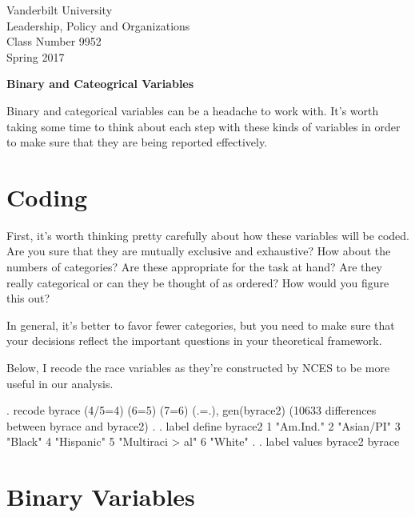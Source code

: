 \documentclass[12 pt]{article}
\begin{document}
\thispagestyle{empty}%


\setlength{\parskip}{1ex plus 0.5ex minus 0.2ex}

\setcounter{secnumdepth}{-2}



\begin{flushleft}
Vanderbilt University\\Leadership, Policy and Organizations\\Class Number 9952\\ Spring 2017
\end{flushleft}

\begin{center}
\textbf{Binary and Cateogrical Variables}
\end{center}


Binary and categorical variables can be a headache to work with. It's worth taking some time to think about each step 
with these kinds of variables in order to make sure that they are being reported effectively. 

\section{Coding}

First, it's worth thinking pretty carefully about how these variables
will be coded. Are you sure that they are mutually exclusive and
exhaustive? How about the numbers of categories? Are these appropriate
for the task at hand? Are they really categorical or can they be
thought of as ordered? How would you figure this out? 

In general, it's better to favor fewer categories, but you need to
make sure that your decisions reflect the important questions in your
theoretical framework. 

Below, I recode the race variables as they're constructed by NCES to
be more useful in our analysis. 

\begin{stlog}

. recode byrace (4/5=4) (6=5) (7=6) (.=.), gen(byrace2)
(10633 differences between byrace and byrace2)
. 
. label define byrace2 1 "Am.Ind." 2 "Asian/PI" 3 "Black" 4 "Hispanic" 5 "Multiraci
> al" 6 "White"
. 
. label values byrace2 byrace  
\end{stlog}

\section{Binary Variables}
\end{document}
